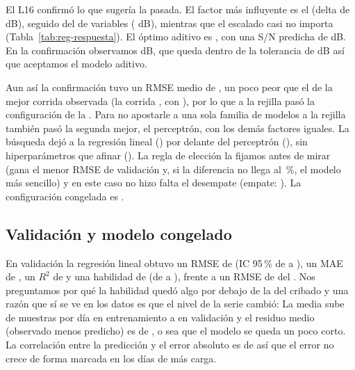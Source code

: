 El L16 confirmó lo que sugería la pasada. El factor más influyente es el
\RegFactorPrincipal{} (delta de \RegDeltaPrincipal{} dB), seguido del
\RegFactorSegundo{} de variables (\RegDeltaSegundo{} dB), mientras que el
escalado casi no importa (Tabla~\ref{tab:reg-respuesta}). El óptimo aditivo
es \emph{\RegOptimo}, con una S/N predicha de \RegSNPredicha{} dB. En la
confirmación observamos \RegSNObservada{} dB, que queda dentro de la
tolerancia de \RegToleranciaSN{} dB así que aceptamos el modelo aditivo.

\begin{table}[!htbp]
\centering
\small
{}
\caption{Tabla de respuesta de Taguchi para la regresión, con la S/N en dB
(mayor es mejor): El rango ordena los factores por su delta y deja al modelo
y al grupo de variables arriba.}
\label{tab:reg-respuesta}
\end{table}

Aun así la confirmación tuvo un RMSE medio de \RegRMSEConfirmacion{}, un poco
peor que el de la mejor corrida observada (la corrida \RegMejorCorrida{}, con
\RegRMSEMejorCorrida{}), por lo que a la rejilla pasó la configuración de la
\RegOrigenConfiguracion{}. Para no apostarle a una sola familia de modelos a
la rejilla también pasó la segunda mejor, el perceptrón, con los demás
factores iguales. La búsqueda dejó a la regresión lineal
(\RegRejillaLinealRMSE{}) por delante del perceptrón (\RegRejillaMLPRMSE{}),
sin hiperparámetros que afinar (\RegHiperparametros{}). La regla de elección
la fijamos antes de mirar (gana el menor RMSE de validación y, si la
diferencia no llega al \RegToleranciaEmpatePct{}\,\%, el modelo más sencillo)
y en este caso no hizo falta el desempate (empate: \RegPorEmpate{}). La
configuración congelada es \emph{\RegConfiguracionFinal}.

\subsection{Validación y modelo congelado}

En validación la regresión lineal obtuvo un RMSE de \RegRMSEValidacion{} (IC
95\,\% de \RegRMSEValidacionInf{} a \RegRMSEValidacionSup{}), un MAE de
\RegMAEValidacion{}, un $R^2$ de \RegRDosValidacion{} y una habilidad de
\RegHabilidadValidacion{} (de \RegHabilidadValidacionInf{} a
\RegHabilidadValidacionSup{}), frente a un RMSE de \RegRMSEValidacionOtro{}
del \MakeLowercase{\RegModeloOtro}. Nos preguntamos por qué la habilidad
quedó algo por debajo de la del cribado y una razón que sí se ve en los datos
es que el nivel de la serie cambió: La media sube de \RegMediaEntrenamiento{}
muestras por día en entrenamiento a \RegMediaValidacion{} en validación y el
residuo medio (observado menos predicho) es de \RegResiduoMedioValidacion{},
o sea que el modelo se queda un poco corto. La correlación entre la
predicción y el error absoluto es de \RegCorrResiduo{} así que el error no
crece de forma marcada en los días de más carga.

